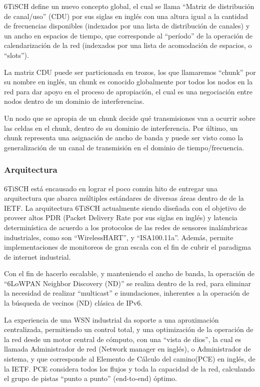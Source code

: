 6TiSCH define un nuevo concepto global, el cual se llama “Matriz de distribución de canal/uso” (CDU) por sus siglas en inglés con una altura igual a la cantidad de frecuencias disponibles (indexados por una lista de distribución de canales) y un ancho en espacios de tiempo, que corresponde al “período” de la operación de calendarización de la red (indexados por una lista de acomodación de espacios, o ``slots'').

La matriz CDU puede ser particionada en trozos, los que llamaremos ``chunk'' por su nombre en inglés, un chunk es conocido globalmente por todos los nodos en la red para dar apoyo en el proceso de apropiación, el cual es una negociación entre nodos dentro de un dominio de interferencias.

Un nodo que se apropia de un chunk decide qué transmisiones van a ocurrir sobre las celdas en el chunk, dentro de su dominio de interferencia. Por último, un chunk representa una asignación de ancho de banda y puede ser visto como la generalización de un canal de transmisión en el dominio de tiempo/frecuencia.

\newpage
\subsubsection{Arquitectura}

6TiSCH está encausado en lograr el poco común hito de entregar una arquitectura que abarca múltiples estándares de diversas áreas dentro de de la IETF. La arquitectura 6TiSCH actualmente siendo diseñada con el objetivo de proveer altos PDR (Packet Delivery Rate por sus siglas en inglés) y latencia determinística de acuerdo a los protocolos de las redes de sensores inalámbricas industriales, como son ``WirelessHART'', y ``ISA100.11a''. Además, permite implementaciones de monitoreos de gran escala con el fin de cubrir el paradigma de internet industrial.

Con el fin de hacerlo escalable, y manteniendo el ancho de banda, la operación de ``6LoWPAN Neighbor Discovery (ND)'' se realiza dentro de la red, para eliminar la necesidad de realizar ``multicast'' e inundaciones, inherentes a la operación de la búsqueda de vecinos (ND) clásica de IPv6.

La experiencia de una WSN industrial da soporte a una aproximación centralizada, permitiendo un control total, y una optimización de la operación de la red desde un motor central de cómputo, con una “vista de dios”, la cual es llamada Administrador de red (Network manager en inglés), o Administrador de sistema, y que corresponde al Elemento de Cálculo del camino(PCE) en inglés, de la IETF. PCE considera todos los flujos y toda la capacidad de la red, calculando el grupo de pistas ``punto a punto'' (end-to-end) óptimo.

